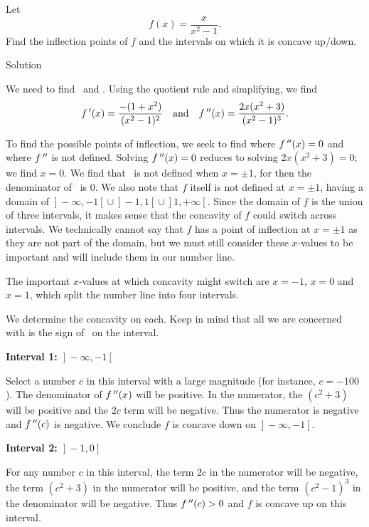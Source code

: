 \begin{example}\label{ex_conc2}
Let 
$$f(x)=\dfrac{x}{x^2-1}.$$
Find the inflection points of $f$ and the intervals on which it is concave up/down.


Solution 

We need to find \fp\ and \fpp. Using the quotient rule and simplifying, we find
$$f\,'(x)=\frac{-(1+x^2)}{(x^2-1)^2} \quad \text{and}\quad f\,''(x) = \frac{2x(x^2+3)}{(x^2-1)^3}.$$

To find the possible points of inflection, we seek to find where $f\,''(x)=0$ and where $f\,''$ is not defined. Solving $f\,''(x)=0$ reduces to solving $2x(x^2+3)=0$; we find $x=0$.  We find that \fpp\ is not defined when $x=\pm 1$, for then the denominator of \fpp\ is 0. We also note that $f$ itself is not defined at $x=\pm1$, having a domain of $\left.\right]-\infty,-1\left[\right.\cup\left.\right]-1,1\left[\right.\cup\left.\right]1,+\infty\left[\right.$. Since the domain of $f$ is the union of three intervals, it makes sense that the concavity of $f$ could switch across intervals. We technically cannot say that $f$ has a point of inflection at $x=\pm1$ as they are not part of the domain, but we must still consider these $x$-values to be important and will include them in our number line.

The important $x$-values at which concavity might switch are $x=-1$, $x=0$ and $x=1$, which  split the number line into four intervals.



 We determine the concavity on each. Keep in mind that all we are concerned with is the sign of \fpp\ on the interval.

\begin{description}
\item \textbf{Interval 1: $\left.\right]-\infty,-1\left[\right.$}

Select a number $c$ in this interval with a large magnitude (for instance, $c=-100$). The denominator of $f\,''(x)$ will be positive. In the numerator, the $(c^2+3)$ will be positive and the $2c$ term will be negative. Thus the numerator is negative and $f\,''(c)$ is negative. We conclude $f$ is concave down on $\left.\right]-\infty,-1\left[\right.$.

\item \textbf{Interval 2: $\left.\right]-1,0\left[\right.$} 

 For any number $c$ in this interval, the term $2c$ in the numerator will be negative, the term $(c^2+3)$ in the numerator will be positive, and the term $(c^2-1)^3$ in the denominator will be negative. Thus $f\,''(c)>0$ and $f$ is concave up on this interval.


\end{description}
\end{example}
